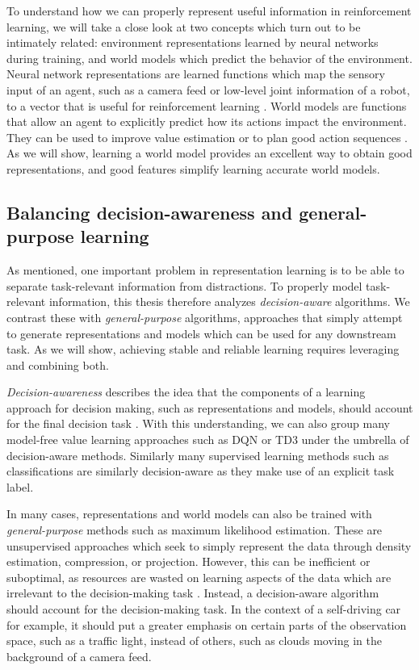 To understand how we can properly represent useful information in reinforcement learning, we will take a close look at two concepts which turn out to be intimately related: environment representations learned by neural networks during training, and world models which predict the behavior of the environment.
Neural network representations are learned functions which map the sensory input of an agent, such as a camera feed or low-level joint information of a robot, to a vector that is useful for reinforcement learning \parencite{ferns2004metrics,jaderberg2017reinforcement,abel2020thesis,le2021metrics}.
World models are functions that allow an agent to explicitly predict how its actions impact the environment.
They can be used to improve value estimation or to plan good action sequences \parencite{dyna,janner2019mbpo,hafner2020dream,schrittwieser2020mastering}.
As we will show, learning a world model provides an excellent way to obtain good representations, and good features simplify learning accurate world models.

\subsection{Balancing decision-awareness and general-purpose learning}
As mentioned, one important problem in representation learning is to be able to separate task-relevant information from distractions.
To properly model task-relevant information, this thesis therefore analyzes \emph{decision-aware} algorithms.
We contrast these with \emph{general-purpose} algorithms, approaches that simply attempt to generate representations and models which can be used for any downstream task.
As we will show, achieving stable and reliable learning requires leveraging and combining both.

\emph{Decision-awareness} describes the idea that the components of a learning approach for decision making, such as representations and models, should account for the final decision task \parencite{vaml,grimm2020value,abachi2020policy,nikishin2021control}.
With this understanding, we can also group many model-free value learning approaches such as DQN \parencite{dqn} or TD3 \parencite{fujimoto2018addressing} under the umbrella of decision-aware methods.
Similarly many supervised learning methods such as classifications are similarly decision-aware as they make use of an explicit task label.

In many cases, representations and world models can also be trained with \emph{general-purpose} methods such as maximum likelihood estimation.
These are unsupervised approaches which seek to simply represent the data through density estimation, compression, or projection.
However, this can be inefficient or suboptimal, as resources are wasted on learning aspects of the data which are irrelevant to the decision-making task \parencite{vaml}.
Instead, a decision-aware algorithm should account for the decision-making task.
In the context of a self-driving car for example, it should put a greater emphasis on certain parts of the observation space, such as a traffic light, instead of others, such as clouds moving in the background of a camera feed.


